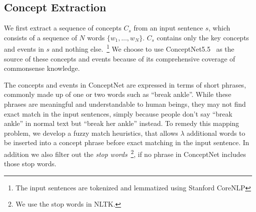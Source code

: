 \subsection{Concept Extraction}
\label{sec:extract}


We first extract a sequence of concepts $C_s$
from an input sentence $s$, which consists of a sequence of
$N$ words $\{w_1, ..., w_N\}$. 
$C_s$ contains only the key concepts and events in $s$ and 
nothing else.~\footnote{The input sentences are 
tokenized and lemmatized using Stanford CoreNLP}
We choose to use ConceptNet5.5~\cite{speer2017conceptnet} as the source of
these concepts and events because of its comprehensive coverage of 
commonsense knowledge. 

The concepts and events in ConceptNet are
expressed in terms of short phrases, commonly made up of one or two words
such as ``break ankle''. While these phrases are meaningful and
understandable to human beings, they may not find exact match
in the input sentences, simply because people don't say ``break ankle'' in
normal text but ``break her ankle'' instead.  
To remedy this mapping problem, we develop a fuzzy match heuristics, that allows
$\lambda$ additional words to be inserted into a concept phrase 
before exact matching in the input sentence.  In addition we also filter out the 
\textit{stop words}~\footnote{We use the stop words in NLTK.}, if no phrase in ConceptNet 
includes those stop words.

